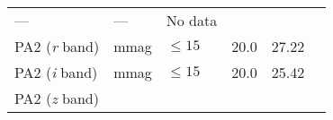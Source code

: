 \documentclass[DM,toc]{lsstdoc}
\begin{document}
\begin{longtable}[]{@{}llllll@{}}
\begin{minipage}[t]{0.17\columnwidth}
---\strut
\end{minipage} & \begin{minipage}[t]{0.12\columnwidth}\raggedright\strut
---\strut
\end{minipage} & \begin{minipage}[t]{0.17\columnwidth}\raggedright\strut
No data\strut
\end{minipage}\tabularnewline
\begin{minipage}[t]{0.14\columnwidth}\raggedright\strut
PA2 (\emph{r} band)\strut
\end{minipage} & \begin{minipage}[t]{0.06\columnwidth}\raggedright\strut
mmag\strut
\end{minipage} & \begin{minipage}[t]{0.17\columnwidth}\raggedright\strut
\(\leq 15\)\strut
\end{minipage} & \begin{minipage}[t]{0.17\columnwidth}\raggedright\strut
20.0\strut
\end{minipage} & \begin{minipage}[t]{0.12\columnwidth}\raggedright\strut
27.22\strut
\end{minipage} & \begin{minipage}[t]{0.17\columnwidth}\raggedright\strut
\strut
\end{minipage}\tabularnewline
\begin{minipage}[t]{0.14\columnwidth}\raggedright\strut
PA2 (\emph{i} band)\strut
\end{minipage} & \begin{minipage}[t]{0.06\columnwidth}\raggedright\strut
mmag\strut
\end{minipage} & \begin{minipage}[t]{0.17\columnwidth}\raggedright\strut
\(\leq 15\)\strut
\end{minipage} & \begin{minipage}[t]{0.17\columnwidth}\raggedright\strut
20.0\strut
\end{minipage} & \begin{minipage}[t]{0.12\columnwidth}\raggedright\strut
25.42\strut
\end{minipage} & \begin{minipage}[t]{0.17\columnwidth}\raggedright\strut
\strut
\end{minipage}\tabularnewline
\begin{minipage}[t]{0.14\columnwidth}\raggedright\strut
PA2 (\emph{z} band)\strut
\end{minipage} & \begin{minipage}[t]{0.06\columnwidth}\raggedright\strut

\end{minipage}
\end{longtable}
\end{document}
